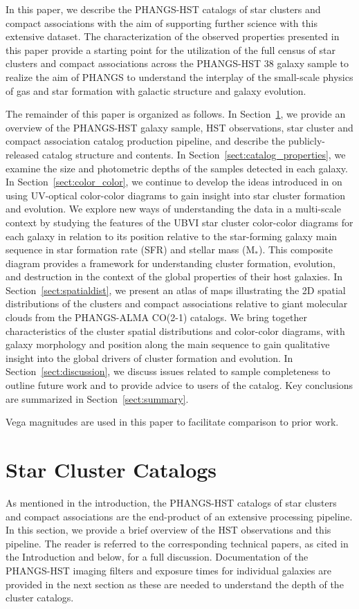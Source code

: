 \documentclass[linenumbers]{aastex63}
\begin{document}
In this paper, we describe the PHANGS-HST catalogs of star clusters and compact associations with the aim of supporting further science with this extensive dataset.  The characterization of the observed properties presented in this paper provide a starting point for the utilization of the full census of star clusters and compact associations across the PHANGS-HST 38 galaxy sample to realize the aim of PHANGS to understand the interplay of the small-scale physics of gas and star formation with galactic structure and galaxy evolution.


The remainder of this paper is organized as follows. In Section~\ref{sect:catalog_content}, we provide an overview of the PHANGS-HST galaxy sample, HST observations, star cluster and compact association catalog production pipeline, and describe the publicly-released catalog structure and contents.  In Section~\ref{sect:catalog_properties}, we examine the size and photometric depths of the samples detected in each galaxy.  In Section~\ref{sect:color_color}, we continue to develop the ideas introduced in \cite{lee23ubvi} on using UV-optical color-color diagrams to gain insight into star cluster formation and evolution.  We explore new ways of understanding the data in a multi-scale context by studying the features of the UBVI star cluster color-color diagrams for each galaxy in relation to its position relative to the star-forming galaxy main sequence in star formation rate (SFR) and stellar mass (M$_*$).  This composite diagram provides a framework for understanding cluster formation, evolution, and destruction in the context of the global properties of their host galaxies.  In Section~\ref{sect:spatialdist}, we present an atlas of maps illustrating the 2D spatial distributions of the clusters and compact associations relative to giant molecular clouds from the PHANGS-ALMA CO(2-1) catalogs.  We bring together characteristics of the cluster spatial distributions and color-color diagrams, with galaxy morphology and position along the main sequence to gain qualitative insight into the global drivers of cluster formation and evolution.  In Section~\ref{sect:discussion}, we discuss issues related to sample completeness to outline future work and to provide advice to users of the catalog.  Key conclusions are summarized in Section~\ref{sect:summary}.

Vega magnitudes are used in this paper to facilitate comparison to prior work.

\section{Star Cluster Catalogs}\label{sect:catalog_content}
As mentioned in the introduction, the PHANGS-HST catalogs of star clusters and compact associations are the end-product of an extensive processing pipeline.  In this section, we provide a brief overview of the HST observations and this pipeline.  The reader is referred to the corresponding technical papers, as cited in the Introduction and below, for a full discussion.  Documentation of the PHANGS-HST imaging filters and exposure times for individual galaxies are provided in the next section as these are needed to understand the depth of the cluster catalogs.   
\end{document}
